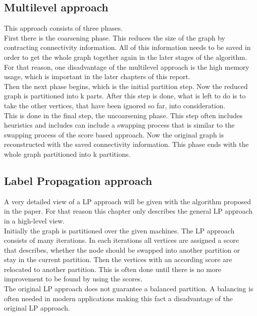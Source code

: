 \documentclass[acmsmall,nonacm,screen,review]{acmart}
\begin{document}
\subsection{Multilevel approach}
This approach consists of three phases. \\
First there is the coarsening phase. This reduces the size of the graph by contracting connectivity information. All of this information needs to be saved in order to get the whole graph together again in the later stages of the algorithm. For that reason, one disadvantage of the multilevel approach is the high memory usage, which is important in the later chapters of this report.\\
Then the next phase begins, which is the initial partition step. Now the reduced graph is partitioned into k parts. After this step is done, what is left to do is to take the other vertices, that have been ignored so far, into consideration.\\
This is done in the final step, the uncoarsening phase. This step often includes heuristics and includes can include a swapping process that is similar to the swapping process of the score based approach. Now the original graph is reconstructed with the saved connectivity information. This phase ends with the whole graph partitioned into k partitions.
\subsection{Label Propagation approach}
A very detailed view of a LP approach will be given with the algorithm proposed in the paper. For that reason this chapter only describes the general LP approach in a high-level view.\\
Initially the graph is partitioned over the given machines. The LP approach consists of many iterations. In each iterations all vertices are assigned a score that describes, whether the node should be swapped into another partition or stay in the current partition. Then the vertices with an according score are relocated to another partition. This is often done until there is no more improvement to be found by using the scores.\\
The original LP approach does not guarantee a balanced partition. A balancing is often needed in modern applications making this fact a disadvantage of the original LP approach.
\end{document}

